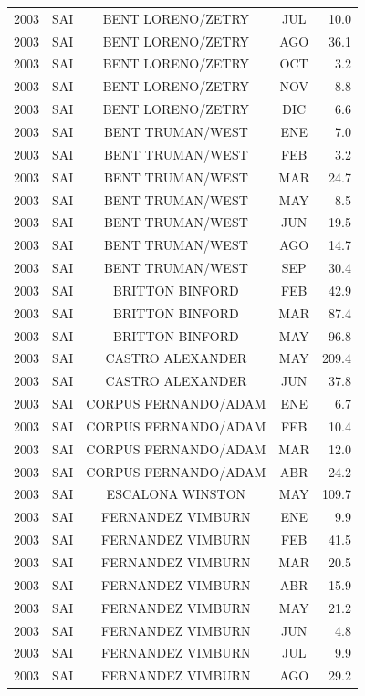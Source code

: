 \documentclass[12pt,]{article}
\begin{document}
\begin{table}[ht]
{\begin{tabular}{lcccr}
  2003 & SAI & BENT LORENO/ZETRY & JUL & 10.0 \\ 
  2003 & SAI & BENT LORENO/ZETRY & AGO & 36.1 \\ 
  2003 & SAI & BENT LORENO/ZETRY & OCT & 3.2 \\ 
  2003 & SAI & BENT LORENO/ZETRY & NOV & 8.8 \\ 
  2003 & SAI & BENT LORENO/ZETRY & DIC & 6.6 \\ 
  2003 & SAI & BENT TRUMAN/WEST & ENE & 7.0 \\ 
  2003 & SAI & BENT TRUMAN/WEST & FEB & 3.2 \\ 
  2003 & SAI & BENT TRUMAN/WEST & MAR & 24.7 \\ 
  2003 & SAI & BENT TRUMAN/WEST & MAY & 8.5 \\ 
  2003 & SAI & BENT TRUMAN/WEST & JUN & 19.5 \\ 
  2003 & SAI & BENT TRUMAN/WEST & AGO & 14.7 \\ 
  2003 & SAI & BENT TRUMAN/WEST & SEP & 30.4 \\ 
  2003 & SAI & BRITTON BINFORD & FEB & 42.9 \\ 
  2003 & SAI & BRITTON BINFORD & MAR & 87.4 \\ 
  2003 & SAI & BRITTON BINFORD & MAY & 96.8 \\ 
  2003 & SAI & CASTRO ALEXANDER & MAY & 209.4 \\ 
  2003 & SAI & CASTRO ALEXANDER & JUN & 37.8 \\ 
  2003 & SAI & CORPUS FERNANDO/ADAM & ENE & 6.7 \\ 
  2003 & SAI & CORPUS FERNANDO/ADAM & FEB & 10.4 \\ 
  2003 & SAI & CORPUS FERNANDO/ADAM & MAR & 12.0 \\ 
  2003 & SAI & CORPUS FERNANDO/ADAM & ABR & 24.2 \\ 
  2003 & SAI & ESCALONA WINSTON & MAY & 109.7 \\ 
  2003 & SAI & FERNANDEZ VIMBURN & ENE & 9.9 \\ 
  2003 & SAI & FERNANDEZ VIMBURN & FEB & 41.5 \\ 
  2003 & SAI & FERNANDEZ VIMBURN & MAR & 20.5 \\ 
  2003 & SAI & FERNANDEZ VIMBURN & ABR & 15.9 \\ 
  2003 & SAI & FERNANDEZ VIMBURN & MAY & 21.2 \\ 
  2003 & SAI & FERNANDEZ VIMBURN & JUN & 4.8 \\ 
  2003 & SAI & FERNANDEZ VIMBURN & JUL & 9.9 \\ 
  2003 & SAI & FERNANDEZ VIMBURN & AGO & 29.2 \\ 

\end{tabular}}
\end{table}
\end{document}
